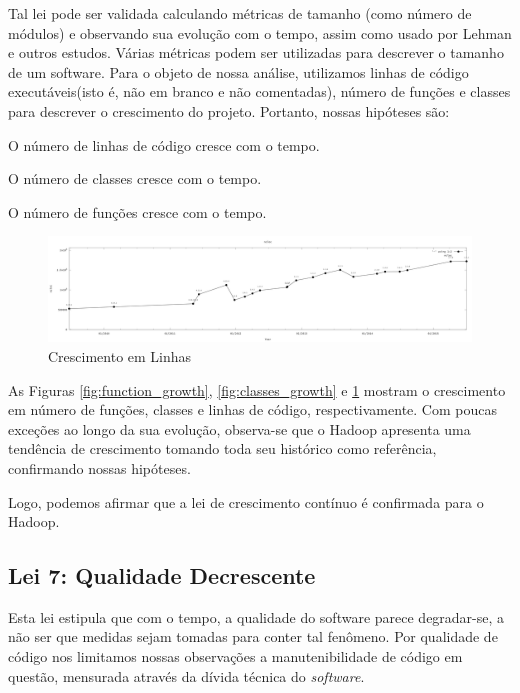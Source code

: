 Tal lei pode ser validada calculando métricas de tamanho (como número de módulos) e observando sua evolução com o tempo, assim como usado por Lehman e outros estudos\cite{lehman1980programs, lehman1985program,neamtiu2013towards}. Várias métricas podem ser utilizadas para descrever o tamanho de um software. Para o objeto de nossa análise, utilizamos linhas de código executáveis(isto é, não em branco e não comentadas), número de funções e classes para descrever o crescimento do projeto.
Portanto, nossas hipóteses são:
\begin{hypothesis}
	O número de linhas de código cresce com o tempo.
\end{hypothesis}
\begin{hypothesis}
	O número de classes cresce com o tempo.
\end{hypothesis}
\begin{hypothesis}
	O número de funções cresce com o tempo.
\end{hypothesis}

\begin{figure}
	\centering
	\includegraphics[width=0.7\linewidth]{figure/ncloc}
	\caption{Crescimento em Linhas}
	\label{fig:lines}
\end{figure}

As Figuras \ref{fig:function_growth}, \ref{fig:classes_growth} e \ref{fig:lines} mostram o crescimento em número de funções, classes e linhas de código, respectivamente. Com poucas exceções ao longo da sua evolução, observa-se que o Hadoop apresenta uma tendência de crescimento tomando toda seu histórico como referência, confirmando nossas hipóteses. 

Logo, podemos afirmar que a lei de crescimento contínuo é confirmada para o Hadoop.



\subsection{Lei 7: Qualidade Decrescente}

Esta lei estipula que com o tempo, a qualidade do software parece degradar-se, a não ser que medidas sejam tomadas para conter tal fenômeno. Por qualidade de código nos limitamos nossas observações a manutenibilidade de código em questão, mensurada através da dívida técnica do \textit{software}.

